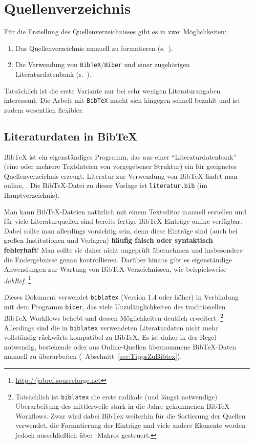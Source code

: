 \section{Quellenverzeichnis}

Für die Erstellung des Quellenverzeichnisses gibt es in \latex zwei
Möglichkeiten:
\begin{enumerate}
\item Das Quellenverzeichnis manuell zu formatieren (s.\ \cite[S.\ 56--57]{Kopka98}).
\item Die Verwendung von \texttt{BibTeX}/\texttt{Biber} und einer zugehörigen 
Literaturdatenbank
(s.\ \cite[S.\ 245--255]{Kopka98}).
\end{enumerate}
Tatsächlich ist die erste Variante nur bei sehr wenigen Literaturangaben interessant.
Die Arbeit mit \texttt{BibTeX} macht sich hingegen schnell bezahlt und ist zudem wesentlich
flexibler.

\subsection{Literaturdaten in BibTeX}
\label{sec:bibtex}

BibTeX ist ein eigenständiges Programm, das aus einer "`Literaturdatenbank"' (eine oder mehrere
Textdateien von vorgegebener Struktur) ein für \latex geeignetes Quellenverzeichnis
erzeugt. Literatur zur Verwendung von BibTeX findet man online, \zB \cite{Taylor96,Patashnik88}.
Die BibTeX-Datei zu dieser Vorlage ist \nolinkurl{literatur.bib} (im Hauptverzeichnis).

Man kann BibTeX-Dateien natürlich mit einem Texteditor manuell erstellen und für
viele Literaturquellen sind bereits fertige BibTeX-Einträge online verfügbar.
Dabei sollte man allerdings vorsichtig sein, denn diese Einträge sind (auch bei großen
Institutionen und Verlagen) \textbf{häufig falsch oder syntaktisch fehlerhaft}!
Man sollte sie daher nicht ungeprüft übernehmen und insbesondere die Endergebnisse genau kontrollieren.
Darüber hinaus gibt es eigenständige Anwendungen zur Wartung von
BibTeX-Verzeichnissen, wie beispielsweise
\emph{JabRef}.%
\footnote{\url{http://jabref.sourceforge.net}}

Dieses Dokument verwendet \texttt{biblatex} (Version 1.4 oder höher) in Verbindung
mit dem Programm \texttt{biber}, 
das viele Unzulänglichkeiten des traditionellen BibTeX-Work\-flows behebt und dessen Möglichkeiten deutlich erweitert.%
\footnote{Tatsächlich ist \texttt{biblatex} die erste radikale (und längst notwendige) Überarbeitung des mittlerweile stark in die Jahre gekommenen BibTeX-Workflows. Zwar wird dabei BibTex weiterhin für 
die Sortierung der Quellen verwendet, die Formatierung der Einträge und viele andere Elemente werden jedoch ausschließlich über \latex-Makros gesteuert.}
Allerdings sind die in \texttt{biblatex} verwendeten Literaturdaten nicht mehr vollständig 
rückwärts-kompatibel zu BibTeX. Es ist daher in der Regel notwendig, bestehende oder aus
Online-Quellen übernommene BibTeX-Daten manuell zu überarbeiten (\sa\ Abschnitt~\ref{sec:TippsZuBibtex}).

